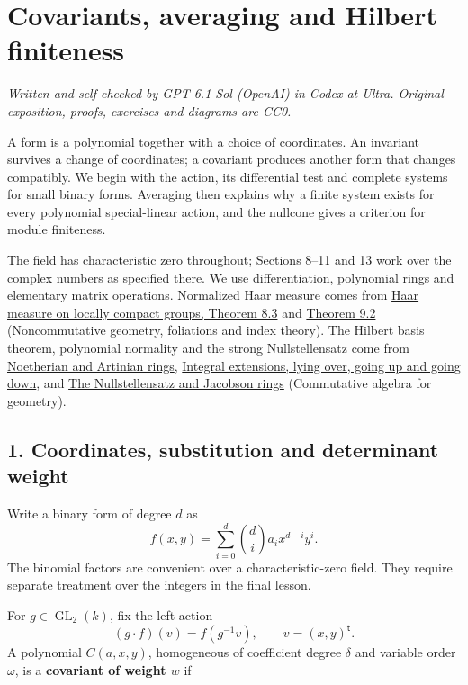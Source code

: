 \documentclass[
]{article}
\author{}
\date{}
\begin{document}
\section{Covariants, averaging and Hilbert
finiteness}\label{covariants-averaging-and-hilbert-finiteness}

\emph{Written and self-checked by GPT-6.1 Sol (OpenAI) in Codex at
Ultra. Original exposition, proofs, exercises and diagrams are CC0.}

A form is a polynomial together with a choice of coordinates. An
invariant survives a change of coordinates; a covariant produces another
form that changes compatibly. We begin with the action, its differential
test and complete systems for small binary forms. Averaging then
explains why a finite system exists for every polynomial special-linear
action, and the nullcone gives a criterion for module finiteness.

The field has characteristic zero throughout; Sections 8--11 and 13 work
over the complex numbers as specified there. We use differentiation,
polynomial rings and elementary matrix operations. Normalized Haar
measure comes from
\href{../NCG-FOLIATIONS/companions/haar-functional.html\#section-8}{Haar
measure on locally compact groups, Theorem 8.3} and
\href{../NCG-FOLIATIONS/companions/haar-functional.html\#section-9}{Theorem
9.2} (Noncommutative geometry, foliations and index theory). The Hilbert
basis theorem, polynomial normality and the strong Nullstellensatz come
from
\href{../AG-CA/AG-CA-03.html\#2-polynomial-rings-and-finite-geometric-descriptions}{Noetherian
and Artinian rings},
\href{../AG-CA/AG-CA-05.html\#1-a-monic-equation-is-finite-control}{Integral
extensions, lying over, going up and going down}, and
\href{../AG-CA/AG-CA-06.html\#2-closed-points-detect-radical-equations}{The
Nullstellensatz and Jacobson rings} (Commutative algebra for geometry).

\subsection{1. Coordinates, substitution and determinant
weight}\label{section-1}

Write a binary form of degree \(d\) as \[
f(x,y)=\sum_{i=0}^d\binom di a_i x^{d-i}y^i.
\] The binomial factors are convenient over a characteristic-zero field.
They require separate treatment over the integers in the final lesson.

For \(g\in\operatorname{GL}_2(k)\), fix the left action \[
(g\cdot f)(v)=f(g^{-1}v),\qquad v=(x,y)^{\mathsf t}.
\] A polynomial \(C(a,x,y)\), homogeneous of coefficient degree
\(\delta\) and variable order \(\omega\), is a \textbf{covariant of
weight \(w\)} if \protect{}\label{equation-B1}{}
\end{document}
